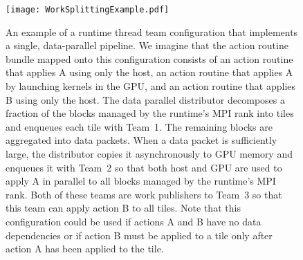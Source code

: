 \documentclass{article}
\begin{document}
\begin{figure}[!ht]
\begin{center}
\texttt{[image: WorkSplittingExample.pdf]}
\caption[]{An example of a runtime thread team configuration that implements a
single, data-parallel pipeline.  We imagine that the action routine bundle
mapped onto this configuration consists of an action routine that applies A
using only the host, an action routine that applies A by launching kernels in
the GPU, and an action routine that applies B using only the host.  The data
parallel distributor decomposes a fraction of the blocks managed by the
runtime's MPI rank into tiles and enqueues each tile with Team~1.  The remaining
blocks are aggregated into data packets.  When a data packet is sufficiently
large, the distributor copies it asynchronously to GPU memory and enqueues it
with Team~2 so that both host and GPU are used to apply A in parallel to all
blocks managed by the runtime's MPI rank.  Both of these teams are work
publishers to Team~3 so that this team can apply action B to all tiles.  Note
that this configuration could be used if actions A and B have no data
dependencies or if action B must be applied to a tile only after action A has
been applied to the tile.}
\label{fig:SplitItor}
\end{center}
\end{figure}
\end{document}
